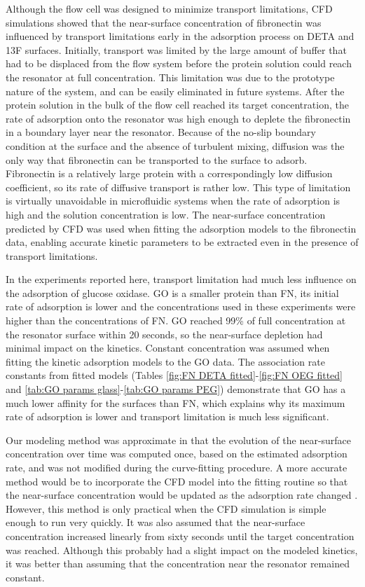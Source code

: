 Although the flow cell was designed to minimize transport limitations,
CFD simulations showed that the near-surface concentration of fibronectin
was influenced by transport limitations early in the adsorption process
on DETA and 13F surfaces. Initially, transport was limited by the
large amount of buffer that had to be displaced from the flow system
before the protein solution could reach the resonator at full concentration.
This limitation was due to the prototype nature of the system, and
can be easily eliminated in future systems. After the protein solution
in the bulk of the flow cell reached its target concentration, the
rate of adsorption onto the resonator was high enough to deplete the
fibronectin in a boundary layer near the resonator. Because of the
no-slip boundary condition at the surface and the absence of turbulent
mixing, diffusion was the only way that fibronectin can be transported
to the surface to adsorb. Fibronectin is a relatively large protein
with a correspondingly low diffusion coefficient, so its rate of diffusive
transport is rather low. This type of limitation is virtually unavoidable
in microfluidic systems when the rate of adsorption is high and the
solution concentration is low. The near-surface concentration predicted
by CFD was used when fitting the adsorption models to the fibronectin
data, enabling accurate kinetic parameters to be extracted even in
the presence of transport limitations.

In the experiments reported here, transport limitation had much less
influence on the adsorption of glucose oxidase. GO is a smaller protein
than FN, its initial rate of adsorption is lower and the concentrations
used in these experiments were higher than the concentrations of FN.
GO reached 99\% of full concentration at the resonator surface within
20 seconds, so the near-surface depletion had minimal impact on the
kinetics. Constant concentration was assumed when fitting the kinetic
adsorption models to the GO data. The association rate constants from
fitted models (Tables \ref{fig:FN DETA fitted}-\ref{fig:FN OEG fitted}
and \ref{tab:GO params glass}-\ref{tab:GO params PEG}) demonstrate
that GO has a much lower affinity for the surfaces than FN, which
explains why its maximum rate of adsorption is lower and transport
limitation is much less significant.

Our modeling method was approximate in that the evolution of the near-surface
concentration over time was computed once, based on the estimated
adsorption rate, and was not modified during the curve-fitting procedure.
A more accurate method would be to incorporate the CFD model into
the fitting routine so that the near-surface concentration would be
updated as the adsorption rate changed \cite{Jenkins2004}. However,
this method is only practical when the CFD simulation is simple enough
to run very quickly. It was also assumed that the near-surface concentration
increased linearly from sixty seconds until the target concentration
was reached. Although this probably had a slight impact on the modeled
kinetics, it was better than assuming that the concentration near
the resonator remained constant.


